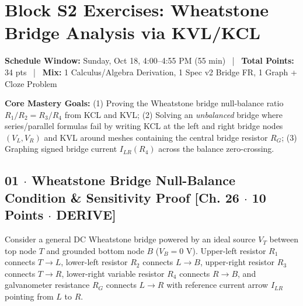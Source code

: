 \documentclass[10pt,letterpaper]{article}
\begin{document}
\section*{Block S2 Exercises: Wheatstone Bridge Analysis via KVL/KCL}

  \textbf{Schedule Window:} Sunday, Oct 18, 4:00--4:55 PM (55 min) ~|~
  \textbf{Total Points:} 34 pts ~|~
  \textbf{Mix:} 1 Calculus/Algebra Derivation, 1 Spec v2 Bridge FR, 1 Graph + Cloze Problem



  \textbf{Core Mastery Goals:} (1) Proving the Wheatstone bridge null-balance ratio $R_1/R_2 = R_3/R_4$ from KCL and KVL; (2) Solving an \emph{unbalanced} bridge where series/parallel formulas fail by writing KCL at the left and right bridge nodes $(V_L, V_R)$ and KVL around meshes containing the central bridge resistor $R_G$; (3) Graphing signed bridge current $I_{LR}(R_4)$ across the balance zero-crossing.


\subsection*{01 $\cdot$ Wheatstone Bridge Null-Balance Condition \& Sensitivity Proof \hfill [Ch. 26 $\cdot$ 10 Points $\cdot$ DERIVE]}

Consider a general DC Wheatstone bridge powered by an ideal source $V_T$ between top node $T$ and grounded bottom node $B$ ($V_B = 0\text{ V}$). Upper-left resistor $R_1$ connects $T \to L$, lower-left resistor $R_2$ connects $L \to B$, upper-right resistor $R_3$ connects $T \to R$, lower-right variable resistor $R_4$ connects $R \to B$, and galvanometer resistance $R_G$ connects $L \to R$ with reference current arrow $I_{LR}$ pointing from $L$ to $R$.
\end{document}
